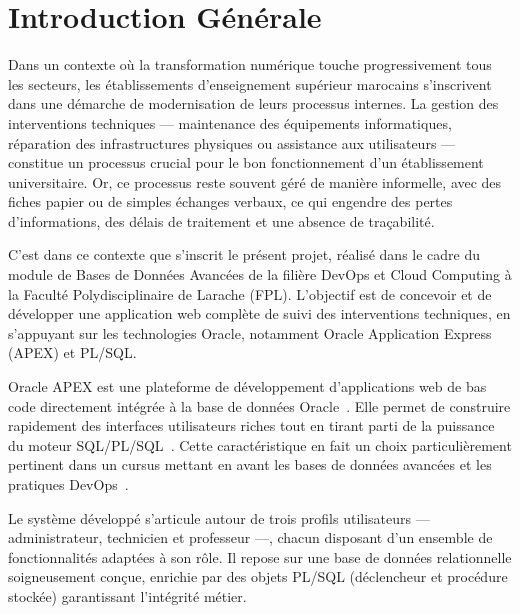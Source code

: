 \documentclass[12pt,a4paper,oneside]{report}
\begin{document}
\clearpage


\chapter*{Introduction Générale}

Dans un contexte où la transformation numérique touche progressivement tous les secteurs, les établissements d'enseignement supérieur marocains s'inscrivent dans une démarche de modernisation de leurs processus internes. La gestion des interventions techniques — maintenance des équipements informatiques, réparation des infrastructures physiques ou assistance aux utilisateurs — constitue un processus crucial pour le bon fonctionnement d'un établissement universitaire. Or, ce processus reste souvent géré de manière informelle, avec des fiches papier ou de simples échanges verbaux, ce qui engendre des pertes d'informations, des délais de traitement et une absence de traçabilité.

C'est dans ce contexte que s'inscrit le présent projet, réalisé dans le cadre du module de Bases de Données Avancées de la filière DevOps et Cloud Computing à la Faculté Polydisciplinaire de Larache (FPL). L'objectif est de concevoir et de développer une application web complète de suivi des interventions techniques, en s'appuyant sur les technologies Oracle, notamment Oracle Application Express (APEX) et PL/SQL.

Oracle APEX est une plateforme de développement d'applications web de bas code directement intégrée à la base de données Oracle~\cite{oracle_apex}. Elle permet de construire rapidement des interfaces utilisateurs riches tout en tirant parti de la puissance du moteur SQL/PL/SQL~\cite{plsql_programming}. Cette caractéristique en fait un choix particulièrement pertinent dans un cursus mettant en avant les bases de données avancées et les pratiques DevOps~\cite{apex_devops}.

Le système développé s'articule autour de trois profils utilisateurs — administrateur, technicien et professeur —, chacun disposant d'un ensemble de fonctionnalités adaptées à son rôle. Il repose sur une base de données relationnelle soigneusement conçue, enrichie par des objets PL/SQL (déclencheur et procédure stockée) garantissant l'intégrité métier.
\end{document}
